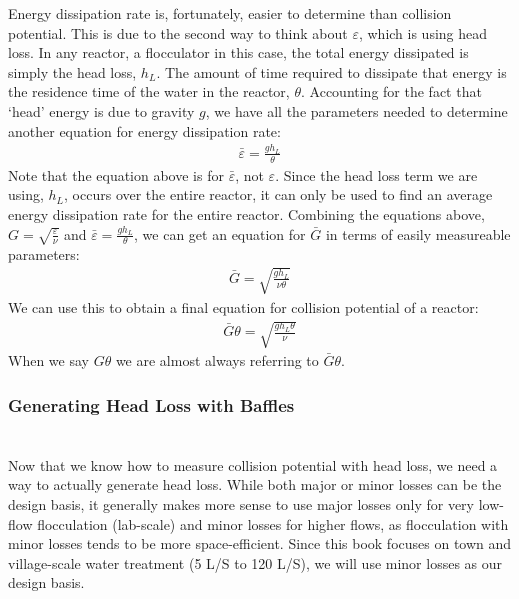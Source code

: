 \documentclass[letterpaper,10pt,english]{sphinxmanual}
\begin{document}
Energy dissipation rate is, fortunately, easier to determine than collision potential. This is due to the second way to think about \(\varepsilon\), which is using head loss. In any reactor, a flocculator in this case, the total energy dissipated is simply the head loss, \(h_L\). The amount of time required to dissipate that energy is the residence time of the water in the reactor, \(\theta\). Accounting for the fact that ‘head’ energy is due to gravity \(g\), we have all the parameters needed to determine another equation for energy dissipation rate:
\begin{equation}\label{equation:Flocculation/Floc_Design:Flocculation/Floc_Design:4}
\begin{split}\bar \varepsilon = \frac{g h_L}{\theta}\end{split}
\end{equation}
Note that the equation above is for \(\bar \varepsilon\), not \(\varepsilon\). Since the head loss term we are using, \(h_L\), occurs over the entire reactor, it can only be used to find an average energy dissipation rate for the entire reactor. Combining the equations above, \(G = \sqrt{\frac{\varepsilon}{\nu}}\) and \(\bar \varepsilon = \frac{g h_L}{\theta}\), we can get an equation for \(\bar G\) in terms of easily measureable parameters:
\begin{equation}\label{equation:Flocculation/Floc_Design:Flocculation/Floc_Design:5}
\begin{split}\bar G = \sqrt{\frac{g h_L}{\nu \theta}}\end{split}
\end{equation}
We can use this to obtain a final equation for collision potential of a reactor:
\begin{equation}\label{equation:Flocculation/Floc_Design:Flocculation/Floc_Design:6}
\begin{split}\bar G \theta = \sqrt{\frac{g h_L \theta}{\nu}}\end{split}
\end{equation}
 When we say \(G \theta\) we are almost always referring to \(\bar G \theta\).


\subsubsection{Generating Head Loss with Baffles}
\label{\detokenize{Flocculation/Floc_Design:generating-head-loss-with-baffles}}

\section{}
\label{\detokenize{Flocculation/Floc_Design:what-are-baffles}}
Now that we know how to measure collision potential with head loss, we need a way to actually generate head loss. While both major or minor losses can be the design basis, it generally makes more sense to use major losses only for very low-flow flocculation (lab-scale) and minor losses for higher flows, as flocculation with minor losses tends to be more space-efficient. Since this book focuses on town and village-scale water treatment (5 L/S to 120 L/S), we will use minor losses as our design basis.
\end{document}
